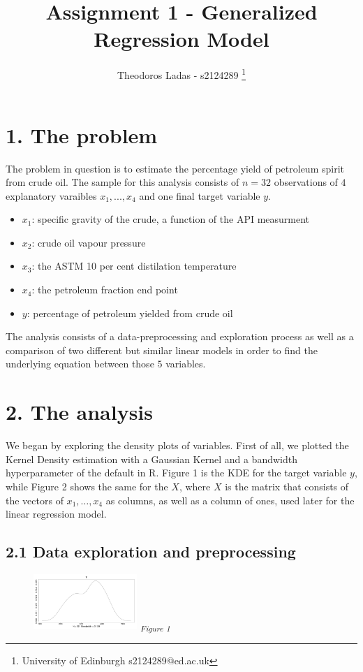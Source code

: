 \documentclass[fleqn, a4paper]{report}
\title{Assignment 1 - Generalized Regression Model}
\author{Theodoros Ladas - s2124289
\footnote{University of Edinburgh s2124289@ed.ac.uk}
}
\date{\parbox{\linewidth}{\centering%
  February 20, 2021\endgraf\bigskip
  Coordinator: Bruce Worton\endgraf\medskip
  Dept.\ of Mathematics \endgraf
  University of Edinburgh}}
\begin{document}
\maketitle

\section*{1. The problem}

The problem in question is to estimate the percentage yield of petroleum spirit from crude oil. The sample for this analysis consists of $n=32$ observations of $4$ explanatory varaibles $x_1,...,x_4$ and one final target variable $y$. 
\begin{itemize}
\item $x_1$: specific gravity of the crude, a function of the API measurment
\item $x_2$: crude oil vapour pressure 
\item $x_3$: the ASTM 10 per cent distilation temperature
\item $x_4$: the petroleum fraction end point
\item   $y$: percentage of petroleum yielded from crude oil
\end{itemize}

The analysis consists of a data-preprocessing and exploration process as well as a comparison of two different but similar linear models in order to find the underlying equation between those $5$ variables. 


\section*{2. The analysis}

We began by exploring the density plots of variables. First of all, we plotted the Kernel Density estimation with a Gaussian Kernel and a bandwidth hyperparameter of the default in \textsf{R}. Figure 1 is the KDE for the target variable $y$, while Figure 2 shows the same for the $X$, where $X$ is the matrix that consists of the vectors of $x_1,\dots,x_4$ as columns, as well as a column of ones, used later for the linear regression model. 

\subsection*{2.1 Data exploration and preprocessing}
\begin{figure}[!h]
\includegraphics[width=0.35\textwidth]{./images/y_kernel.jpg}
\textsubscript{\textit{Figure 1}}
\label{tab:fig_1}
\end{figure}
\end{document}
